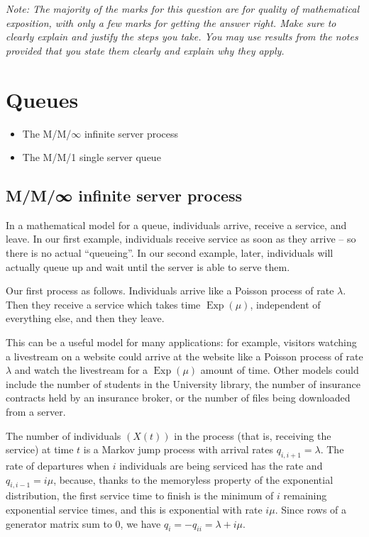 \documentclass[
  a4paper,
]{article}
\providecommand{\tightlist}{%
  \setlength{\itemsep}{0pt}\setlength{\parskip}{0pt}}
\theoremstyle{definition}
\theoremstyle{definition}
\theoremstyle{definition}
\theoremstyle{remark}
\begin{document}
\emph{Note: The majority of the marks for this question are for quality of mathematical exposition, with only a few marks for getting the answer right. Make sure to clearly explain and justify the steps you take. You may use results from the notes provided that you state them clearly and explain why they apply.}

\hypertarget{S21-queues}{%
\section{Queues}\label{S21-queues}}

\begin{itemize}
\tightlist
\item
  The M/M/\(\infty\) infinite server process
\item
  The M/M/1 single server queue
\end{itemize}

\hypertarget{MMinf}{%
\subsection{M/M/∞ infinite server process}\label{MMinf}}

In a mathematical model for a queue, individuals arrive, receive a service, and leave. In our first example, individuals receive service as soon as they arrive -- so there is no actual ``queueing''. In our second example, later, individuals will actually queue up and wait until the server is able to serve them.

Our first process as follows. Individuals arrive like a Poisson process of rate \(\lambda\). Then they receive a service which takes time \(\operatorname{Exp}(\mu)\), independent of everything else, and then they leave.

This can be a useful model for many applications: for example, visitors watching a livestream on a website could arrive at the website like a Poisson process of rate \(\lambda\) and watch the livestream for a \(\operatorname{Exp}(\mu)\) amount of time. Other models could include the number of students in the University library, the number of insurance contracts held by an insurance broker, or the number of files being downloaded from a server.

The number of individuals \((X(t))\) in the process (that is, receiving the service) at time \(t\) is a Markov jump process with arrival rates \(q_{i,i+1} = \lambda\). The rate of departures when \(i\) individuals are being serviced has the rate and \(q_{i,i-1} = i\mu\), because, thanks to the memoryless property of the exponential distribution, the first service time to finish is the minimum of \(i\) remaining exponential service times, and this is exponential with rate \(i\mu\). Since rows of a generator matrix sum to 0, we have \(q_i = -q_{ii} = \lambda + i\mu\).
\end{document}
